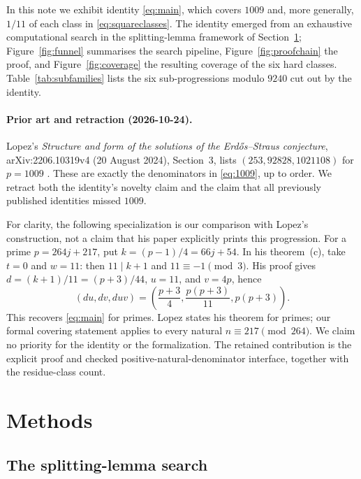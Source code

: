 \documentclass[11pt,a4paper]{article}
\theoremstyle{definition}
\begin{document}
In this note we exhibit identity \eqref{eq:main}, which covers $1009$ and,
more generally, $1/11$ of each class in \eqref{eq:squareclasses}. The
identity emerged from an exhaustive computational search in the
splitting-lemma framework of Section~\ref{sec:methods}; Figure~\ref{fig:funnel}
summarises the search pipeline, Figure~\ref{fig:proofchain} the proof, and
Figure~\ref{fig:coverage} the resulting coverage of the six hard classes.
Table~\ref{tab:subfamilies} lists the six sub-progressions modulo $9240$
cut out by the identity.

\paragraph{Prior art and retraction (2026-10-24).}
Lopez's \emph{Structure and form of the solutions of the Erd\H{o}s--Straus
conjecture}, arXiv:2206.10319v4 (20 August 2024), Section~3, lists
$(253,92828,1021108)$ for $p=1009$ \cite{lopez2024}. These are exactly
the denominators in \eqref{eq:1009}, up to order. We retract both the
identity's novelty claim and the claim that all previously published
identities missed $1009$.

For clarity, the following specialization is our comparison with Lopez's
construction, not a claim that his paper explicitly prints this progression.
For a prime $p=264j+217$, put $k=(p-1)/4=66j+54$. In his theorem~(c),
take $t=0$ and $w=11$: then $11\mid k+1$ and $11\equiv-1\pmod3$.
His proof gives $d=(k+1)/11=(p+3)/44$, $u=11$, and $v=4p$, hence
\[
 (du,dv,duv)=\left(\frac{p+3}{4},\frac{p(p+3)}{11},p(p+3)\right).
\]
This recovers \eqref{eq:main} for primes. Lopez states his theorem for
primes; our formal covering statement applies to every natural
$n\equiv217\pmod{264}$. We claim no priority for the identity or the
formalization. The retained contribution is the explicit proof and checked
positive-natural-denominator interface, together with the residue-class count.

\section{Methods}
\label{sec:methods}

\subsection{The splitting-lemma search}
\end{document}
